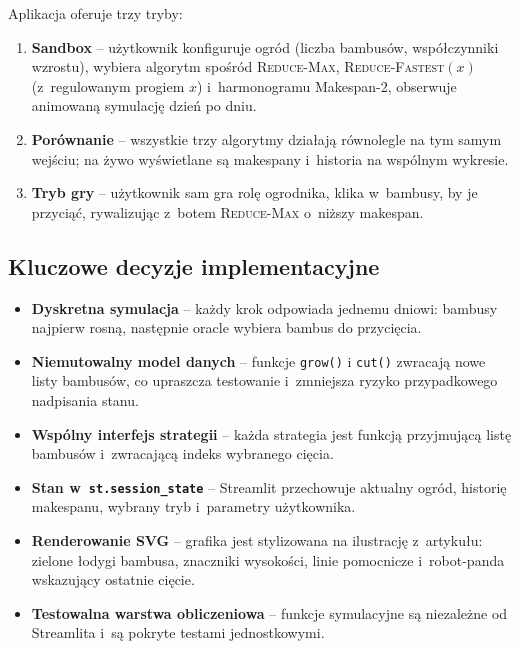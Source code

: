 \documentclass[12pt,a4paper]{article}
\theoremstyle{plain}
\theoremstyle{definition}
\theoremstyle{remark}
\newcommand{\RF}{\textsc{Reduce-Fastest}}
\newcommand{\RM}{\textsc{Reduce-Max}}
\begin{document}
Aplikacja oferuje trzy tryby:

\begin{enumerate}[noitemsep]
  \item \textbf{Sandbox} – użytkownik konfiguruje ogród (liczba bambusów,
        współczynniki wzrostu), wybiera algorytm spośród \RM{}, \RF$(x)$
        (z~regulowanym progiem $x$) i~harmonogramu Makespan-2, obserwuje
        animowaną symulację dzień po dniu.

  \item \textbf{Porównanie} – wszystkie trzy algorytmy działają
        równolegle na tym samym wejściu; na żywo wyświetlane są
        makespany i~historia na wspólnym wykresie.

  \item \textbf{Tryb gry} – użytkownik sam gra rolę ogrodnika,
        klika w~bambusy, by je przyciąć, rywalizując z~botem
        \RM{} o~niższy makespan.
\end{enumerate}

\subsection{Kluczowe decyzje implementacyjne}

\begin{itemize}[noitemsep]
  \item \textbf{Dyskretna symulacja} – każdy krok odpowiada jednemu dniowi:
        bambusy najpierw rosną, następnie oracle wybiera bambus do przycięcia.
  \item \textbf{Niemutowalny model danych} – funkcje \texttt{grow()} i
        \texttt{cut()} zwracają nowe listy bambusów, co upraszcza testowanie
        i~zmniejsza ryzyko przypadkowego nadpisania stanu.
  \item \textbf{Wspólny interfejs strategii} – każda strategia jest funkcją
        przyjmującą listę bambusów i~zwracającą indeks wybranego cięcia.
  \item \textbf{Stan w~\texttt{st.session\_state}} – Streamlit przechowuje
        aktualny ogród, historię makespanu, wybrany tryb i~parametry
        użytkownika.
  \item \textbf{Renderowanie SVG} – grafika jest stylizowana na ilustrację
        z~artykułu: zielone łodygi bambusa, znaczniki wysokości, linie
        pomocnicze i~robot-panda wskazujący ostatnie cięcie.
  \item \textbf{Testowalna warstwa obliczeniowa} – funkcje symulacyjne są
        niezależne od Streamlita i~są pokryte testami jednostkowymi.
\end{itemize}
\end{document}
